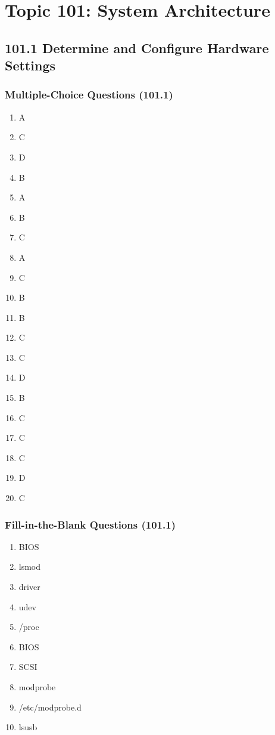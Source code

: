 \documentclass[12pt,a4paper]{report}
\begin{document}
\section*{Topic 101: System Architecture}

\subsection*{101.1 Determine and Configure Hardware Settings}
\subsubsection*{Multiple-Choice Questions (101.1)}
\begin{enumerate}[1.]
    \item A
    \item C
    \item D
    \item B
    \item A
    \item B
    \item C
    \item A
    \item C
    \item B
    \item B
    \item C
    \item C
    \item D
    \item B
    \item C
    \item C
    \item C
    \item D
    \item C
    \end{enumerate}

\subsubsection*{Fill-in-the-Blank Questions (101.1)}
\begin{enumerate}[1.]
    \item BIOS
    \item lsmod
    \item driver
    \item udev
    \item /proc
    \item BIOS
    \item SCSI
    \item modprobe
    \item /etc/modprobe.d
    \item lsusb
    \end{enumerate}
\end{document}

